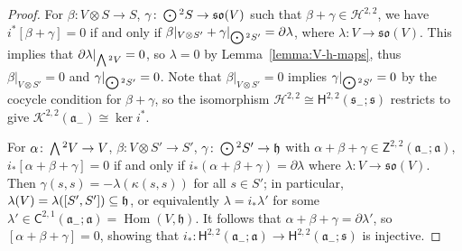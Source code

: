 \documentclass[11pt]{article}
\numberwithin{equation}{section}
\numberwithin{equation}{section}
\newcommand{\fa}{\mathfrak{a}}
\newcommand{\fh}{\mathfrak{h}}
\newcommand{\fs}{\mathfrak{s}}
\newcommand{\fso}{\mathfrak{so}}
\newcommand{\cH}{\mathcal{H}}
\newcommand{\cK}{\mathcal{K}}
\newcommand{\ssC}{\mathsf{C}}
\newcommand{\ssH}{\mathsf{H}}
\newcommand{\ssZ}{\mathsf{Z}}
\newcommand{\Wedge}{\mathchoice{{\textstyle\bigwedge}}{\bigwedge}{\bigwedge}{\bigwedge}}	%
\newcommand{\Odot}{\mathchoice{{\textstyle\bigodot}}{\bigodot}{\bigodot}{\bigodot}}
\newcommand{\1}{\mathbbm{1}}
\DeclareMathOperator{\Hom}{Hom}
\begin{document}
\begin{proof}
	For $\beta\colon V\otimes S\to S$, $\gamma\colon \Odot^2S\to\fso(V)$ such that $\beta+\gamma\in\cH^{2,2}$, we have $i^*[\beta+\gamma]=0$ if and only if $\beta|_{V\otimes S'}+\gamma|_{\Odot^2S'}=\partial\lambda$, where $\lambda\colon V\to\fso(V)$. This implies that $\partial\lambda|_{\Wedge^2 V}=0$, so $\lambda=0$ by Lemma~\ref{lemma:V-h-maps}, thus $\beta|_{V\otimes S'}=0$ and $\gamma|_{\Odot^2S'}=0$. Note that $\beta|_{V\otimes S'}=0$ implies $\gamma|_{\Odot^2S'}=0$ by the cocycle condition for $\beta+\gamma$, so the isomorphism $\cH^{2,2}\cong\ssH^{2,2}(\fs_-;\fs)$ restricts to give $\cK^{2,2}(\fa_-)\cong \ker i^*$.
	
	For $\alpha\colon \Wedge^2V\to V$, $\beta\colon V\otimes S'\to S'$, $\gamma\colon \Odot^2S'\to\fh$ with $\alpha+\beta+\gamma\in\ssZ^{2,2}(\fa_-;\fa)$, $i_*[\alpha+\beta+\gamma]=0$ if and only if $i_*(\alpha+\beta+\gamma)=\partial\lambda$ where $\lambda:V\to\fso(V)$. Then $\gamma(s,s)=-\lambda(\kappa(s,s))$ for all $s\in S'$; in particular, $\lambda(V)=\lambda(\comm{S'}{S'})\subseteq\fh$, or equivalently $\lambda=i_*\lambda'$ for some $\lambda'\in\ssC^{2,1}(\fa_-;\fa)=\Hom(V,\fh)$. It follows that $\alpha+\beta+\gamma=\partial\lambda'$, so $[\alpha+\beta+\gamma]=0$, showing that $i_*\colon \ssH^{2,2}(\fa_-;\fa)\to \ssH^{2,2}(\fa_-;\fs)$ is injective.
\end{proof}
\end{document}
